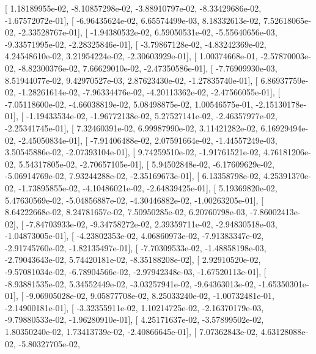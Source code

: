 \documentclass{article}
\begin{document}
       [  1.18189955e-02,  -8.10857298e-02,  -3.88910797e-02,
         -8.33429686e-02,  -1.67572072e-01],
       [ -6.96435624e-02,   6.65574499e-03,   8.18332613e-02,
          7.52618065e-02,  -2.33528767e-01],
       [ -1.94380532e-02,   6.59050531e-02,  -5.55640656e-03,
         -9.33571995e-02,  -2.28325846e-01],
       [ -3.79867128e-02,  -4.83242369e-02,   4.24548610e-02,
          3.21954224e-02,  -2.30603929e-01],
       [  1.00374668e-01,  -2.57870003e-02,  -8.82300376e-02,
          7.66629010e-02,  -2.47350586e-01],
       [ -7.76909930e-03,   8.51944077e-02,   9.42970527e-03,
          2.87623430e-02,  -1.27835740e-01],
       [  6.86937759e-02,  -1.28261614e-02,  -7.96334476e-02,
         -4.20113362e-02,  -2.47566055e-01],
       [ -7.05118600e-02,  -4.66038819e-02,   5.08498875e-02,
          1.00546575e-01,  -2.15130178e-01],
       [ -1.19433534e-02,  -1.96772138e-02,   5.27527141e-02,
         -2.46357977e-02,  -2.25341745e-01],
       [  7.32460391e-02,   6.99987990e-02,   3.11421282e-02,
          6.16929494e-02,  -2.45050834e-01],
       [ -7.91406488e-02,   2.07591664e-02,  -1.44557249e-03,
          3.50545886e-02,  -2.07393104e-01],
       [  9.74259510e-02,  -1.91761521e-02,   4.76181206e-02,
          5.54317805e-02,  -2.70657105e-01],
       [  5.94502848e-02,  -6.17609629e-02,  -5.06914769e-02,
          7.93244288e-02,  -2.35169673e-01],
       [  6.13358798e-02,   4.25391370e-02,  -1.73895855e-02,
         -4.10486021e-02,  -2.64839425e-01],
       [  5.19369820e-02,   5.47630569e-02,  -5.04856887e-02,
         -4.30446882e-02,  -1.00263205e-01],
       [  8.64222668e-02,   8.24781657e-02,   7.50950285e-02,
          6.20760798e-03,  -7.86002413e-02],
       [ -7.84703933e-02,  -9.34758272e-02,   2.39359711e-02,
         -2.94830518e-03,  -1.04873005e-01],
       [ -4.23802353e-02,   4.06860973e-02,  -7.91383347e-02,
         -2.91745760e-02,  -1.82135497e-01],
       [ -7.70309533e-02,  -1.48858198e-03,  -2.79043643e-02,
          5.74420181e-02,  -8.35188208e-02],
       [  2.92910520e-02,  -9.57081034e-02,  -6.78904566e-02,
         -2.97942348e-03,  -1.67520113e-01],
       [ -8.93881535e-02,   5.34552449e-02,  -3.03257941e-02,
         -9.64363013e-02,  -1.65350301e-01],
       [ -9.06905028e-02,   9.05877708e-02,   8.25033240e-02,
         -1.00732481e-01,  -2.14900181e-01],
       [ -3.32355911e-02,   1.10214725e-02,  -2.16370179e-03,
         -9.79880533e-02,  -1.96280910e-01],
       [  4.25171637e-02,  -3.57899502e-02,   1.80350240e-02,
          1.73413739e-02,  -2.40866645e-01],
       [  7.07362843e-02,   4.63128088e-02,  -5.80327705e-02,
\end{document}
